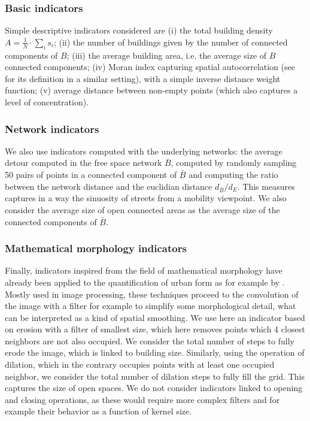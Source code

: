 \documentclass[letterpaper]{article}
\begin{document}
\subsubsection{Basic indicators}
Simple descriptive indicators considered are (i) the total building density $A = \frac{1}{N}\cdot \sum_i s_i$; (ii) the number of buildings given by the number of connected components of $B$; (iii) the average building area, i.e. the average size of $B$ connected components; (iv) Moran index capturing spatial autocorrelation (see \cite{raimbault2018calibration} for its definition in a similar setting), with a simple inverse distance weight function; (v) average distance between non-empty points (which also captures a level of concentration).


\subsubsection{Network indicators}

We also use indicators computed with the underlying networks: the average detour computed in the free space network $\bar{B}$, computed by randomly sampling 50 pairs of points in a connected component of $\bar{B}$ and computing the ratio between the network distance and the euclidian distance $d_{\bar{B}}/d_E$. This measures captures in a way the sinuosity of streets from a mobility viewpoint. We also consider the average size of open connected areas as the average size of the connected components of $\bar{B}$.


\subsubsection{Mathematical morphology indicators}

Finally, indicators inspired from the field of mathematical morphology \citep{serra1983image} have already been applied to the quantification of urban form as for example by \cite{pesaresi2003recognizing}. Mostly used in image processing, these techniques proceed to the convolution of the image with a filter for example to simplify some morphological detail, what can be interpreted as a kind of spatial smoothing. We use here an indicator based on erosion with a filter of smallest size, which here removes points which 4 closest neighbors are not also occupied. We consider the total number of steps to fully erode the image, which is linked to building size. Similarly, using the operation of dilation, which in the contrary occupies points with at least one occupied neighbor, we consider the total number of dilation steps to fully fill the grid. This captures the size of open spaces. We do not consider indicators linked to opening and closing operations, as these would require more complex filters and for example their behavior as a function of kernel size.
\end{document}

